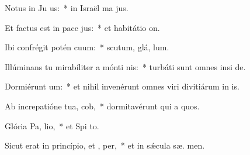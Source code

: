 \item Notus in Ju us:~* in Israël ma  jus.
\item Et factus est in pace  jus:~* et habitátio   on.
\item Ibi confrégit potén cuum:~* scutum, glá,  lum.
\item Illúminans tu mirabíliter a mónti nis:~* turbáti sunt omnes insi de.
\item Dormiérunt  um:~* et nihil invenérunt omnes viri divitiárum in  is.
\item Ab increpatióne tua,  cob,~* dormitavérunt qui a quos.
\item Glória Pa,  lio,~* et Spi to.
\item Sicut erat in princípio, et ,  per,~* et in sǽcula sæ. men.
